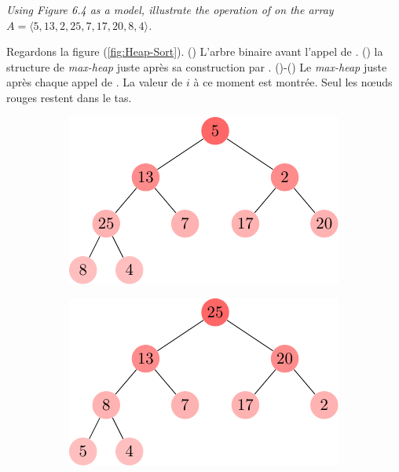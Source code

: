\begin{description}
 \textit{Using Figure 6.4 as a model, illustrate the operation of  on the array \\$A = \langle 5, 13, 2, 25, 7, 17, 20, 8, 4 \rangle$.}
    \begin{ex}
      Regardons la figure (\ref{fig:Heap-Sort}). () L'arbre binaire avant l'appel de  . () la structure de \textit{max-heap} juste apr\`es sa construction par . ()-() Le \textit{max-heap} juste apr\`es chaque appel de . La valeur de $i$ \`a ce moment est montr\'ee. Seul les n\oe uds rouges restent dans le tas.
      \begin{figure}[H]%
        \centering
        \begin{subfigure}[t]{.30\textwidth}
          \centering
          \includegraphics[scale=0.8]{img/6_4-1/6_4-1_1}
          \caption{}\label{fig:6_4-1_1}
        \end{subfigure}
        \begin{subfigure}[t]{.30\textwidth}
          \centering
          \includegraphics[scale=0.8]{img/6_4-1/6_4-1_2}
          \caption{}\label{fig:6_4-1_2}
        \end{subfigure}
        \begin{subfigure}[t]{.30\textwidth}

\end{subfigure}
\end{figure}
\end{ex}
\end{description}
